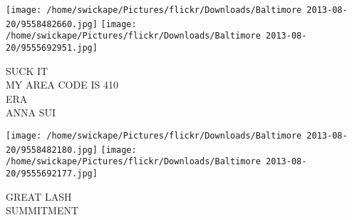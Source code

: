 \documentclass[10pt,letterpaper]{article}
\begin{document}
\texttt{[image: /home/swickape/Pictures/flickr/Downloads/Baltimore 2013-08-20/9558482660.jpg]}
\texttt{[image: /home/swickape/Pictures/flickr/Downloads/Baltimore 2013-08-20/9555692951.jpg]}

SUCK IT\\
MY AREA CODE IS 410\\
ERA\\
ANNA SUI\\
\pagebreak

\texttt{[image: /home/swickape/Pictures/flickr/Downloads/Baltimore 2013-08-20/9558482180.jpg]}
\texttt{[image: /home/swickape/Pictures/flickr/Downloads/Baltimore 2013-08-20/9555692177.jpg]}

GREAT LASH\\
SUMMITMENT\\
\pagebreak
\end{document}
